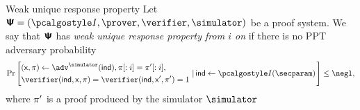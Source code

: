 \documentclass[runningheads,11pt]{llncs}
\begin{document}
\begin{definition}{Weak unique response property}
  Let $\PS = (\indexer, \prover, \verifier, \simulator)$ be a proof system. We say
  that $\bm{\mathsf{\Psi}}$ has \emph{weak unique response property from $i$ on} if there is no PPT
   adversary probability
  \[
    \Pr \left[ %
      \begin{aligned}
        & (\inp, \zkproof) \gets \adv^{\simulator} (\ind), \zkproof[:i] =
        \zkproof'[:i], \\
        & \verifier (\ind, \inp, \zkproof) = \verifier (\ind, \inp', \zkproof') = 1 %
      \end{aligned}
      \,\left| \, %
        \ind \gets \indexer (\secparam) \right. %
    \right] \leq \negl,
  \]
  where $\pi'$ is a proof produced by the simulator $\simulator$
\end{definition}
\end{document}
